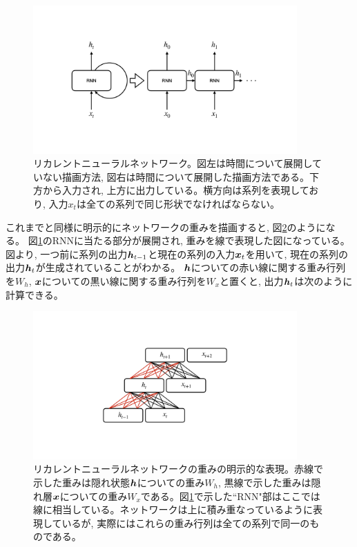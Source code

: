 \begin{figure}[htbp]
 \centering
 \includegraphics[trim = 0 200 0 200, width=0.9\textwidth, clip]{Figure/2DeepLearning/7RecurrentNeuralNetwork.png}
 \caption[リカレントニューラルネットワーク]{リカレントニューラルネットワーク。図左は時間について展開していない描画方法, 図右は時間について展開した描画方法である。下方から入力され, 上方に出力している。横方向は系列を表現しており, 入力$x_t$は全ての系列で同じ形状でなければならない。}
 \label{7RecurrentNeuralNetwork}
\end{figure}

これまでと同様に明示的にネットワークの重みを描画すると, 図\ref{8RNNWeight}のようになる。
図\ref{7RecurrentNeuralNetwork}のRNNに当たる部分が展開され, 重みを線で表現した図になっている。
図より, 一つ前に系列の出力${\mbox{\boldmath{$h$}}}_{t-1}$と現在の系列の入力${\mbox{\boldmath{$x$}}}_t$を用いて, 現在の系列の出力${\mbox{\boldmath{$h$}}}_t$が生成されていることがわかる。
${\mbox{\boldmath{$h$}}}$についての赤い線に関する重み行列を$W_h$, ${\mbox{\boldmath{$x$}}}$についての黒い線に関する重み行列を$W_x$と置くと, 出力${\mbox{\boldmath{$h$}}}_t$は次のように計算できる。

\begin{figure}[htbp]
 \centering
 \includegraphics[trim = 0 200 0 200, width=0.9\textwidth, clip]{Figure/2DeepLearning/8RNNWeight.png}
 \caption[リカレントニューラルネットワークの重みの明示的な表現]{リカレントニューラルネットワークの重みの明示的な表現。赤線で示した重みは隠れ状態${\mbox{\boldmath{$h$}}}$についての重み$W_h$, 黒線で示した重みは隠れ層${\mbox{\boldmath{$x$}}}$についての重み$W_x$である。図\ref{7RecurrentNeuralNetwork}で示した``RNN"部はここでは線に相当している。ネットワークは上に積み重なっているように表現しているが, 実際にはこれらの重み行列は全ての系列で同一のものである。}
 \label{8RNNWeight}
\end{figure}

